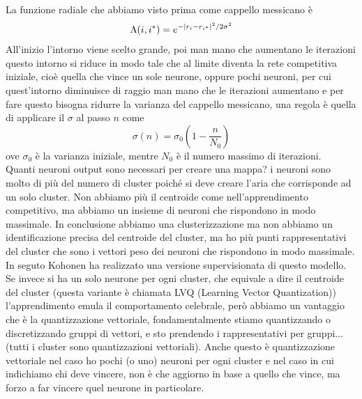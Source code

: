 \noindent La funzione radiale che abbiamo visto prima come cappello messicano è
\begin{equation}
\Lambda(i,i^*) = e^{- \lvert r_i - r_{i^*}\rvert^2 / 2\sigma^2}
\end{equation}
All'inizio l'intorno viene scelto grande, poi man mano che aumentano le iterazioni questo intorno si riduce in modo tale che al limite diventa la rete competitiva iniziale, cioè quella che vince un sole neurone, oppure pochi neuroni, per cui quest'intorno diminuisce di raggio man mano che le iterazioni aumentano e per fare questo bisogna ridurre la varianza del cappello messicano, una regola è quella di applicare il $\sigma$  al passo $n$ come
\begin{equation}
\sigma(n) = \sigma_0 \left( 1 - \frac{n}{N_0} \right)
\end{equation}
ove $\sigma_0$ è la varianza iniziale, mentre $N_0$ è il numero massimo di iterazioni.  \\

\noindent Quanti neuroni output sono necessari per creare una mappa? i neuroni sono molto di più del numero di cluster poiché si deve creare l'aria che corrisponde ad un solo cluster. Non abbiamo più il centroide come nell'apprendimento competitivo, ma abbiamo un insieme di neuroni che rispondono in modo massimale. In conclusione abbiamo una clusterizzazione ma non abbiamo un identificazione precisa del centroide del cluster, ma ho più punti rappresentativi del cluster che sono i vettori peso dei neuroni che rispondono in modo massimale.\\

\noindent In seguto Kohonen ha realizzato una versione supervisionata di questo modello. Se invece si ha un solo neurone per ogni cluster, che equivale a dire il centroide del cluster (questa variante è chiamata LVQ (Learning Vector Quantization)) l'apprendimento emula il comportamento celebrale, però abbiamo un vantaggio che è la quantizzazione vettoriale, fondamentalmente stiamo quantizzando o discretizzando gruppi di vettori, e sto prendendo i rappresentativi per gruppi... (tutti i cluster sono quantizzazioni vettoriali). Anche questo è quantizzazione vettoriale nel caso ho pochi (o uno) neuroni per ogni cluster e nel caso in cui indichiamo chi deve vincere, non è che aggiorno in base a quello che vince, ma forzo a far vincere quel neurone in particolare. 

%
